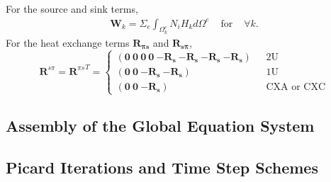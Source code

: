 For the source and sink terms, 
\begin{equation}
\begin{array}{lll}
\bm{W}_{k} = \Sigma_{e} \int_{\Omega_k^e} N_i H_k d\Omega^e 
&\mbox{~for~}& \forall k. 
\end{array}
\end{equation}
For the heat exchange terms $\bm{R_{\pi s}}$ and $\bm{R_{s \pi}}$, 
\begin{equation}
\bm{R}^{s \pi} = {\bm{R}^{\pi s}}^{T} = \left\{ \begin{array}{ll}
(\bm{0}~\bm{0}~\bm{0}~\bm{0}~\bm{-R_s}~\bm{-R_s}~\bm{-R_s}~\bm{-R_s}) 
   & \mbox{~~2U} \\
(\bm{0}~\bm{0}~\bm{-R_s}~\bm{-R_s}) 
   & \mbox{~~1U} \\
(\bm{0}~\bm{0}~\bm{-R_s}) 
   & \mbox{~~CXA or CXC} 
       \end{array} \right.
\end{equation}
\subsection{Assembly of the Global Equation System}



\subsection{Picard Iterations and Time Step Schemes}